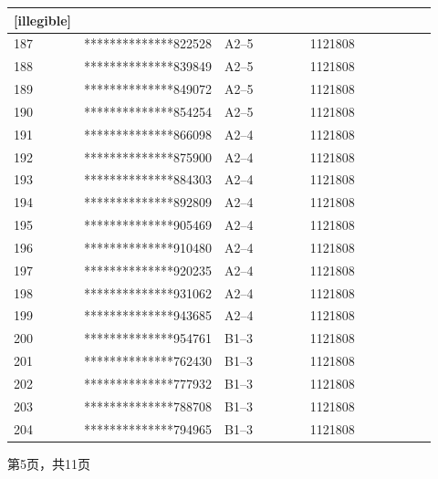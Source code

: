 \documentclass[UTF8,10pt,a4paper,fontset=fandol]{ctexart}
\newcommand{\fieldvalue}[1]{#1}
\newcommand{\handwritten}[1]{#1}
\begin{document}
\begin{center}
\begin{tabular}{|p{0.08\linewidth}|p{0.30\linewidth}|p{0.22\linewidth}|p{0.20\linewidth}|p{0.12\linewidth}|}
\fieldvalue{\handwritten{[illegible]}} \\
\hline
187 & **************822528 & A2--5 & 1121808 & \\
\hline
188 & **************839849 & A2--5 & 1121808 & \\
\hline
189 & **************849072 & A2--5 & 1121808 & \\
\hline
190 & **************854254 & A2--5 & 1121808 & \\
\hline
191 & **************866098 & A2--4 & 1121808 & \\
\hline
192 & **************875900 & A2--4 & 1121808 & \\
\hline
193 & **************884303 & A2--4 & 1121808 & \\
\hline
194 & **************892809 & A2--4 & 1121808 & \\
\hline
195 & **************905469 & A2--4 & 1121808 & \\
\hline
196 & **************910480 & A2--4 & 1121808 & \\
\hline
197 & **************920235 & A2--4 & 1121808 & \\
\hline
198 & **************931062 & A2--4 & 1121808 & \\
\hline
199 & **************943685 & A2--4 & 1121808 & \\
\hline
200 & **************954761 & B1--3 & 1121808 & \\
\hline
201 & **************762430 & B1--3 & 1121808 & \\
\hline
202 & **************777932 & B1--3 & 1121808 & \\
\hline
203 & **************788708 & B1--3 & 1121808 & \\
\hline
204 & **************794965 & B1--3 & 1121808 & \\
\hline
\end{tabular}
\end{center}

\normalsize

\begin{center}
第5页，共11页
\end{center}

\newpage
\end{document}
